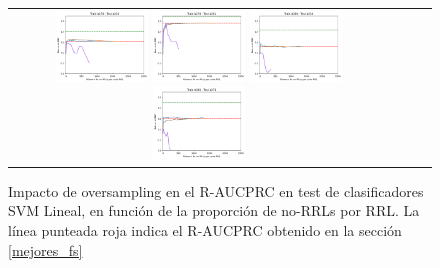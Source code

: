 \begin{figure}[h!]
\begin{tabular}{cccc}
\includegraphics[width=0.25\textwidth]{Kap7/UNIFIED_train=b278_test=b234_linear_curves.png}  \includegraphics[width=0.25\textwidth]{Kap7/UNIFIED_train=b278_test=b261_linear_curves.png} 
 \includegraphics[width=0.25\textwidth]{Kap7/UNIFIED_train=b360_test=b234_linear_curves.png}  \includegraphics[width=0.25\textwidth]{Kap7/UNIFIED_train=b360_test=b278_linear_curves.png} 
\end{tabular}
\caption{Impacto de oversampling en el R-AUCPRC en test de clasificadores SVM Lineal, en función de la proporción de no-RRLs por RRL. La línea punteada roja indica el R-AUCPRC obtenido en la sección \protect\ref{mejores_fs}}
\label{fig:svm_oversampling}
\end{figure}

